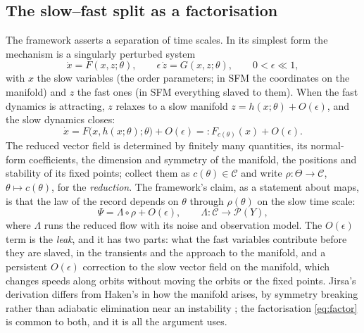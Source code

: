 \documentclass[10pt]{article}
\begin{document}
\subsection{The slow--fast split as a factorisation}
The framework asserts a separation of time scales. In its simplest form the mechanism is a singularly perturbed system
\begin{equation}
\dot x=F(x,z;\theta),\qquad \epsilon\,\dot z=G(x,z;\theta),\qquad 0<\epsilon\ll1,
\label{eq:slowfast}
\end{equation}
with $x$ the slow variables (the order parameters; in SFM the coordinates on the manifold) and $z$ the fast ones (in SFM everything slaved to them). When the fast dynamics is attracting, $z$ relaxes to a slow manifold $z=h(x;\theta)+O(\epsilon)$, and the slow dynamics closes:
\begin{equation}
\dot x=F\bigl(x,h(x;\theta);\theta\bigr)+O(\epsilon)=:F_{c(\theta)}(x)+O(\epsilon).
\label{eq:reduced}
\end{equation}
The reduced vector field is determined by finitely many quantities, its normal-form coefficients, the dimension and symmetry of the manifold, the positions and stability of its fixed points; collect them as $c(\theta)\in\mathcal{C}$ and write $\rho:\Theta\to\mathcal{C}$, $\theta\mapsto c(\theta)$, for the \emph{reduction}. The framework's claim, as a statement about maps, is that the law of the record depends on $\theta$ through $\rho(\theta)$ on the slow time scale:
\begin{equation}
\Psi=\Lambda\circ\rho+O(\epsilon),\qquad \Lambda:\mathcal{C}\to\mathcal{P}(Y),
\label{eq:factor}
\end{equation}
where $\Lambda$ runs the reduced flow with its noise and observation model. The $O(\epsilon)$ term is the \emph{leak}, and it has two parts: what the fast variables contribute before they are slaved, in the transients and the approach to the manifold, and a persistent $O(\epsilon)$ correction to the slow vector field on the manifold, which changes speeds along orbits without moving the orbits or the fixed points. Jirsa's derivation differs from Haken's in how the manifold arises, by symmetry breaking rather than adiabatic elimination near an instability \parencite{jirsa2020,pillai2017}; the factorisation \eqref{eq:factor} is common to both, and it is all the argument uses.
\end{document}
